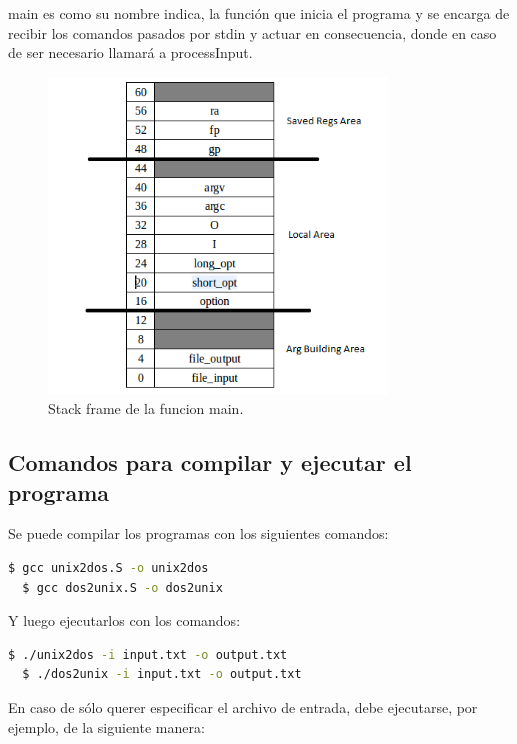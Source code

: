 \documentclass[a4paper]{article}
\begin{document}
main es como su nombre indica, la función que inicia el programa y se encarga de recibir los comandos pasados por stdin y actuar en consecuencia, donde en caso de ser necesario llamará a processInput.

\begin{figure}[!htp]
\begin{center}
\includegraphics[width=0.8\textwidth]{stack-main1.png}
\caption{Stack frame de la funcion main.} \label{fig001}
\end{center}
\end{figure}

\subsection{Comandos para compilar y ejecutar el programa}

Se puede compilar los programas con los siguientes comandos:

\begin{lstlisting}[language=bash]
  $ gcc unix2dos.S -o unix2dos
  $ gcc dos2unix.S -o dos2unix
\end{lstlisting}


Y luego ejecutarlos con los comandos:

\begin{lstlisting}[language=bash]
  $ ./unix2dos -i input.txt -o output.txt
  $ ./dos2unix -i input.txt -o output.txt
\end{lstlisting}

En caso de sólo querer especificar el archivo de entrada, debe ejecutarse, por ejemplo, de la siguiente manera:
\end{document}
